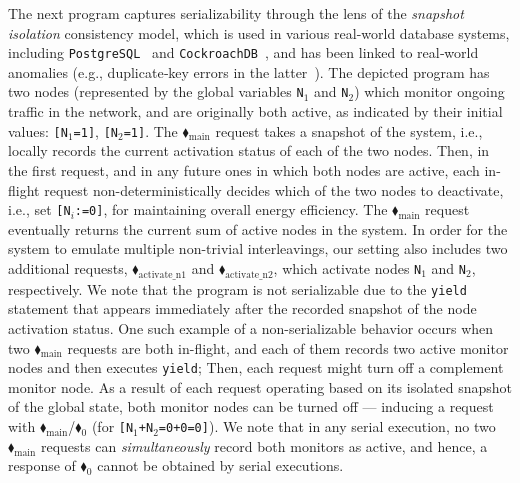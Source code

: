 The next program captures serializability through the lens of the \textit{snapshot isolation} consistency model, which is used in various real-world database systems, including \texttt{PostgreSQL}~\cite{postgresql-transaction-iso} and \texttt{CockroachDB}~\cite{cockroachdb-si-docs}, and has been linked to real‐world anomalies (e.g., duplicate‐key errors in the latter~\cite{cockroach-issue-14099}).
%
The depicted program has two nodes (represented by the global variables \texttt{N$_1$} and \texttt{N$_2$}) which monitor ongoing traffic in the network, and are originally both active, as indicated by their initial values: \texttt{[N$_1$=1]}, \texttt{[N$_2$=1]}.
%
The {\color{ForestGreen}$\blacklozenge_\text{main}$} request takes a snapshot of the system, i.e., locally records the current activation status of each of the two nodes.
%
Then, in the first request, and in any future ones in which both nodes are active, each in-flight request non-deterministically decides which of the two nodes to deactivate, i.e., set \texttt{[N$_i$:=0]}, for maintaining overall energy efficiency.
%
The {\color{ForestGreen}$\blacklozenge_\text{main}$} request eventually returns the current sum of active nodes in the system.
%
In order for the system to emulate multiple non-trivial interleavings, our setting also includes two additional requests, {\color{ForestGreen}$\blacklozenge_\text{activate\_n1}$} and {\color{ForestGreen}$\blacklozenge_\text{activate\_n2}$}, which activate nodes \texttt{N$_1$} and \texttt{N$_2$}, respectively.
%
We note that the program is not serializable due to the \texttt{yield} statement that appears immediately after the recorded snapshot of the node activation status. One such example of a non-serializable behavior occurs when two {\color{ForestGreen}$\blacklozenge_\text{main}$} requests are both in-flight, and each of them records two active monitor nodes and then executes \texttt{yield}; Then, each request might turn off a complement monitor node. As a result of each request operating based on its isolated snapshot of the global state, both monitor nodes can be turned off --- inducing a request with {\color{ForestGreen}$\blacklozenge_\text{main}$}/{\color{red}$\blacklozenge_0$} (for \texttt{[N$_1$+N$_2$=0+0=0]}).
%
We note that in any serial execution, no two {\color{ForestGreen}$\blacklozenge_\text{main}$} requests can \textit{simultaneously} record both monitors as active, and hence, a response of {\color{red}$\blacklozenge_0$} cannot be obtained by serial executions.




